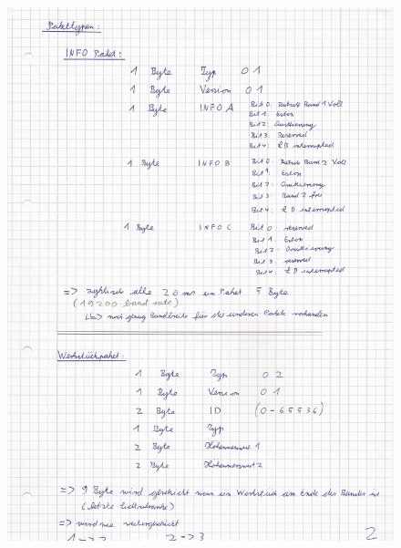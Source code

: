 \documentclass[a4paper, 11pt]{article}
\begin{document}
\newpage

\begin{figure}[H]
\centering 
    \includegraphics[scale=0.8]{SI/si2.jpg}
    \label{si2}
\end{figure}

\newpage
\end{document}

